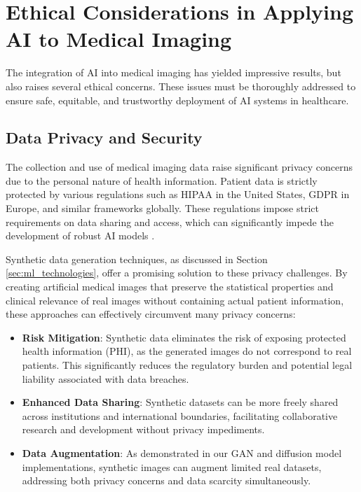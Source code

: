 \documentclass{article}
\begin{document}
\section{Ethical Considerations in Applying AI to Medical Imaging}
\label{sec:ethical_implications}
The integration of AI into medical imaging has yielded impressive results, but also raises several ethical concerns. These issues must be thoroughly addressed to ensure safe, equitable, and trustworthy deployment of AI systems in healthcare.


\subsection{Data Privacy and Security}
The collection and use of medical imaging data raise significant privacy concerns due to the personal nature of health information. Patient data is strictly protected by various regulations such as HIPAA in the United States, GDPR in Europe, and similar frameworks globally. These regulations impose strict requirements on data sharing and access, which can significantly impede the development of robust AI models \cite{koetzierGeneratingSyntheticData2024}.

Synthetic data generation techniques, as discussed in Section \ref{sec:ml_technologies}, offer a promising solution to these privacy challenges. By creating artificial medical images that preserve the statistical properties and clinical relevance of real images without containing actual patient information, these approaches can effectively circumvent many privacy concerns:

\begin{itemize}
    \item \textbf{Risk Mitigation}: Synthetic data eliminates the risk of exposing protected health information (PHI), as the generated images do not correspond to real patients. This significantly reduces the regulatory burden and potential legal liability associated with data breaches.
    
    \item \textbf{Enhanced Data Sharing}: Synthetic datasets can be more freely shared across institutions and international boundaries, facilitating collaborative research and development without privacy impediments.
    
    \item \textbf{Data Augmentation}: As demonstrated in our GAN and diffusion model implementations, synthetic images can augment limited real datasets, addressing both privacy concerns and data scarcity simultaneously.
\end{itemize}
\end{document}
